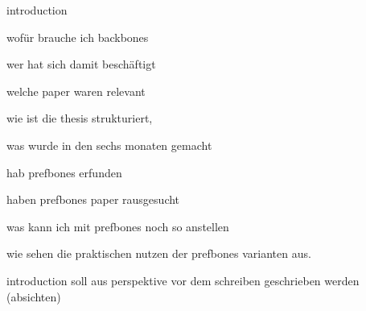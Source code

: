 introduction

wofür brauche ich backbones

wer hat sich damit beschäftigt

welche paper waren relevant

wie ist die thesis strukturiert, 

was wurde in den sechs monaten gemacht





hab prefbones erfunden

haben prefbones paper rausgesucht

was kann ich mit prefbones noch so anstellen

wie sehen die praktischen nutzen der prefbones varianten aus.



introduction soll aus perspektive vor dem schreiben geschrieben werden (absichten)